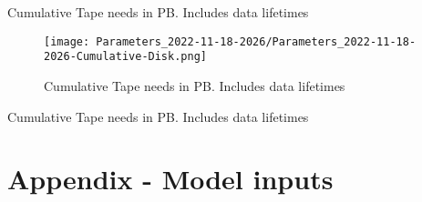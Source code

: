 \begin{table}[h]
\centering{}\label{tab:Cumulative-Tape
}
\caption{Cumulative Tape needs in PB. Includes data lifetimes}
\end{table}
\begin{figure}[h]
\centering\texttt{[image: Parameters\_2022-11-18-2026/Parameters\_2022-11-18-2026-Cumulative-Disk.png]}\label{fig:Cumulative-Disk}
\caption{Cumulative Tape needs in PB. Includes data lifetimes}
\end{figure}
\begin{table}[h]
\centering{}\label{tab:Cumulative-Disk
}
\caption{Cumulative Tape needs in PB. Includes data lifetimes}
\end{table}

\clearpage
\section{Appendix - Model inputs}



